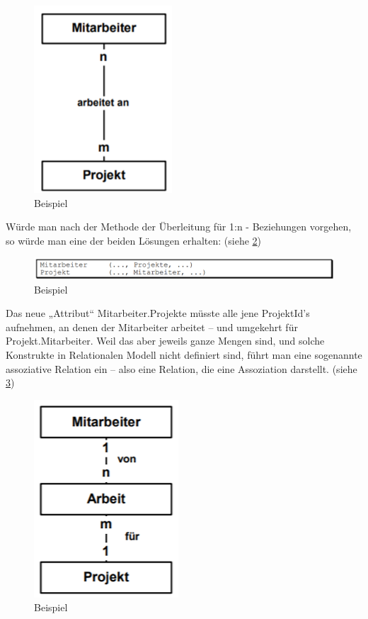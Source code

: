 \begin{figure}[H]
    \centering
    \includegraphics[width=.3\textwidth]{Content/images/modellierung/mitarbeiterprojekt.png}
    \caption{Beispiel}
    \label{fig:modellierung:mitproj}
\end{figure}

Würde man nach der Methode der Überleitung für 1:n - Beziehungen vorgehen, so würde man eine der beiden Lösungen erhalten: (siehe \ref{fig:modellierung:mitproj2})

\begin{figure}[H]
    \centering
    \includegraphics[width=.8\textwidth]{Content/images/modellierung/mitproj.png}
    \caption{Beispiel}
    \label{fig:modellierung:mitproj2}
\end{figure}

Das neue „Attribut“ Mitarbeiter.Projekte müsste alle jene ProjektId’s aufnehmen, an denen der Mitarbeiter arbeitet – und umgekehrt für Projekt.Mitarbeiter. Weil das aber jeweils ganze Mengen sind, und solche Konstrukte in Relationalen Modell nicht definiert sind, führt man eine sogenannte assoziative Relation ein – also eine Relation, die eine Assoziation darstellt. (siehe \ref{fig:modellierung:mitproj3})

\begin{figure}[H]
    \centering
    \includegraphics[width=.3\textwidth]{Content/images/modellierung/mitproj3.png}
    \caption{Beispiel}
    \label{fig:modellierung:mitproj3}
\end{figure}

